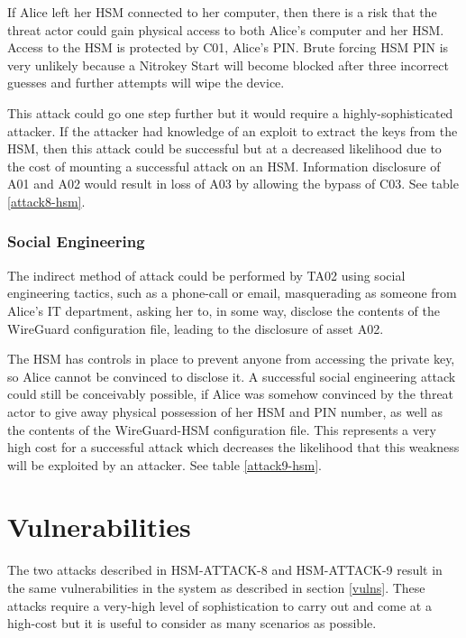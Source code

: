 \documentclass [11pt, proquest] {uwthesis}[2020/02/24]
\begin{document}
If Alice left her HSM connected to her computer, then there is a risk that the threat actor could gain physical access to both Alice's computer and her HSM. Access to the HSM is protected by C01, Alice's PIN. Brute forcing HSM PIN is very unlikely because a Nitrokey Start will become blocked after three incorrect guesses and further attempts will wipe the device.

This attack could go one step further but it would require a highly-sophisticated attacker. If the attacker had knowledge of an exploit to extract the keys from the HSM, then this attack could be successful but at a decreased likelihood due to the cost of mounting a successful attack on an HSM. Information disclosure of A01 and A02 would result in loss of A03 by allowing the bypass of C03. 
See table \ref{attack8-hsm}.

\subsubsection{Social Engineering}
The indirect method of attack could be performed by TA02 using social engineering tactics, such as a phone-call or email, masquerading as someone from Alice's IT department, asking her to, in some way, disclose the contents of the WireGuard configuration file, leading to the disclosure of asset A02.

The HSM has controls in place to prevent anyone from accessing the private key, so Alice cannot be convinced to disclose it.
A successful social engineering attack could still be conceivably possible, if Alice was somehow convinced by the threat actor to give away physical possession of her HSM and PIN number, as well as the contents of the WireGuard-HSM configuration file. This represents a very high cost for a successful attack which decreases the likelihood that this weakness will be exploited by an attacker. 
See table \ref{attack9-hsm}.

\section{Vulnerabilities}
\label{hsm-vulns}
The two attacks described in HSM-ATTACK-8 and HSM-ATTACK-9 result in the same vulnerabilities in the system as described in section \ref{vulns}. These attacks require a very-high level of sophistication to carry out and come at a high-cost but it is useful to consider as many scenarios as possible.
\end{document}
